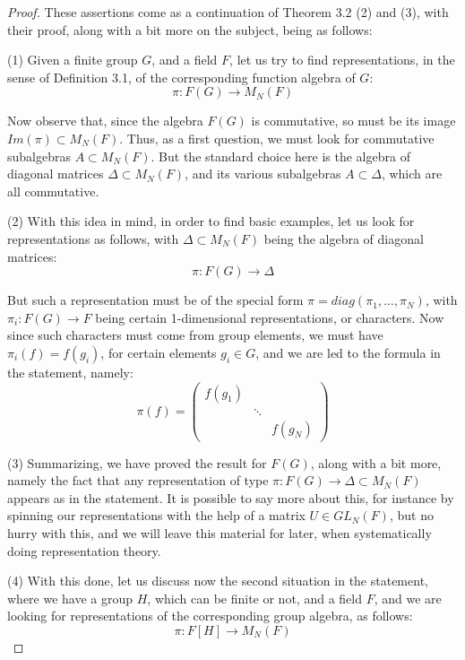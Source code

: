 \documentclass[12pt]{amsbook}
\begin{document}
\begin{proof}
These assertions come as a continuation of Theorem 3.2 (2) and (3), with their proof, along with a bit more on the subject, being as follows:

\medskip

(1) Given a finite group $G$, and a field $F$, let us try to find representations, in the sense of Definition 3.1, of the corresponding function algebra of $G$:
$$\pi:F(G)\to M_N(F)$$

Now observe that, since the algebra $F(G)$ is commutative, so must be its image $Im(\pi)\subset M_N(F)$. Thus, as a first question, we must look for commutative subalgebras $A\subset M_N(F)$. But the standard choice here is the algebra of diagonal matrices $\Delta\subset M_N(F)$, and its various subalgebras $A\subset\Delta$, which are all commutative.

\medskip

(2) With this idea in mind, in order to find basic examples, let us look for representations as follows, with $\Delta\subset M_N(F)$ being the algebra of diagonal matrices:
$$\pi:F(G)\to\Delta$$

But such a representation must be of the special form $\pi=diag(\pi_1,\ldots,\pi_N)$, with $\pi_i:F(G)\to F$ being certain 1-dimensional representations, or characters. Now since such characters must come from group elements, we must have $\pi_i(f)=f(g_i)$, for certain elements $g_i\in G$, and we are led to the formula in the statement, namely:
$$\pi(f)=\begin{pmatrix}
f(g_1)\\
&\ddots\\
&&f(g_N)
\end{pmatrix}$$

(3) Summarizing, we have proved the result for $F(G)$, along with a bit more, namely the fact that any representation of type $\pi:F(G)\to\Delta\subset M_N(F)$ appears as in the statement. It is possible to say more about this, for instance by spinning our representations with the help of a matrix $U\in GL_N(F)$, but no hurry with this, and we will leave this material for later, when systematically doing representation theory.

\medskip

(4) With this done, let us discuss now the second situation in the statement, where we have a group $H$, which can be finite or not, and a field $F$, and we are looking for representations of the corresponding group algebra, as follows:
$$\pi:F[H]\to M_N(F)$$


\end{proof}
\end{document}
